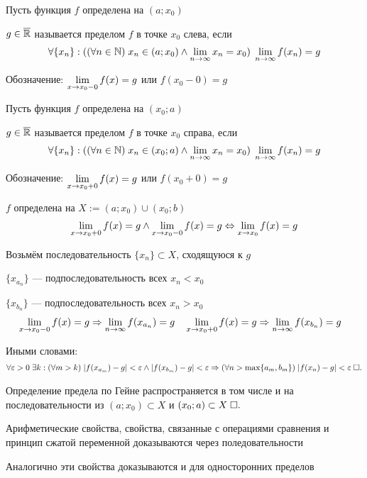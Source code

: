 \documentclass{article}
\begin{document}


Пусть функция $f$ определена на $(a;x_0)$

$g\in\overline\R$ называется пределом  $f$ в точке $x_0$ слева, если
\begin{align*}
	\forall\{x_{n}\}:((\forall n\in\N)\;x_{n}\in(a;x_0)\land\slimty x_{n}=x_0)\;\slimty f(x_{n})=g
\end{align*}

Обозначение: $\slim{x\to x_0-0}f(x)=g$ или $f(x_0-0)=g$

Пусть функция $f$ определена на $(x_0;a)$

$g\in\overline\R$ называется пределом  $f$ в точке $x_0$ справа, если
\begin{align*}
	\forall\{x_{n}\}:((\forall n\in\N)\;x_{n}\in(x_0;a)\land\slimty x_{n}=x_0)\;\slimty f(x_{n})=g
\end{align*}

Обозначение: $\slim{x\to x_0+0}f(x)=g$ или $f(x_0+0)=g$

\theorem

$f$ определена на $X:=(a;x_0)\cup(x_0;b)$
\begin{align*}
	\slim{x\to x_0+0}f(x)=g\land\slim{x\to x_0-0}f(x)=g\Lrarr\slim{x\to x_0}f(x)=g
\end{align*}

\onlyif

Возьмём последовательность $\{x_{n}\}\subset X$, сходящуюся к $g$

$\{x_{a_{n}}\}$ --- подпоследовательность всех $x_{n}<x_0$

$\{x_{b_{n}}\}$ --- подпоследовательность всех $x_{n}>x_0$
\begin{align*}
	 & \slim{x\to x_0-0}f(x)=g\Rarr \slimty f(x_{a_{n}})=g &  & \slim{x\to x_0+0}f(x)=g\Rarr\slimty f(x_{b_{n}})=g
\end{align*}

Иными словами:
\begin{align*}
	\forall\eps>0\;\exists k:(\forall m>k)\;|f(x_{a_{m}})-g|<\eps\land|f(x_{b_{m}})-g|<\eps\Rarr (\forall n>\max\{a_{m},b_{m}\})\;|f(x_{n})-g|<\eps\qed
\end{align*}

\enough

Определение предела по Гейне распространяется в том числе и на последовательности из $(a;x_0)\subset X$ и $(x_0;a)\subset X\qed$


Арифметические свойства, свойства, связанные с операциями сравнения и принцип сжатой переменной доказываются через поледовательности

Аналогично эти свойства доказываются и для односторонних пределов
\end{document}
